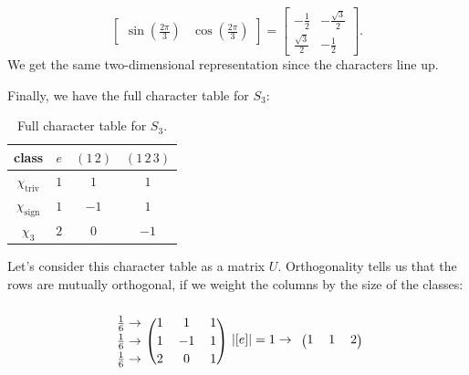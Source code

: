 \documentclass[12pt]{article}
\theoremstyle{definition}
\begin{document}
\begin{enumerate}[start=0]
\begin{enumerate}[(a)]
\begin{equation}
\begin{bmatrix}
                \sin \left( \frac{2\pi }{3} \right) & \cos \left( \frac{2\pi }{3} \right)
            \end{bmatrix}
            =
            \begin{bmatrix}
                -\frac{1}{2} & -\frac{\sqrt{3}}{2} \\[0.5em]
                \frac{\sqrt{3}}{2} & -\frac{1}{2}
            \end{bmatrix}.
        \end{equation}
        We get the same two-dimensional representation since the characters line up.
    \end{enumerate}
    Finally, we have the full character table for $S_3$:
    \begin{table}[H]
        \centering
        \begin{tabular}{|| c || c | c | c ||}
            \hline
            class & $e$ & $(1\,2)$ & $(1\,2\,3)$ \\
            \hline
            $\chi_{\text{triv}}$ & $1$ & $1$ & $1$ \\
            $\chi_{\text{sign}}$ & $1$ & $-1$ & $1$ \\
            $\chi_3$ & $2$ & $0$ & $-1$ \\
            \hline
        \end{tabular}
        \caption{Full character table for $S_3$.}
        \label{tab:Table6}
    \end{table}
    Let's consider this character table as a matrix $U$. Orthogonality tells us that the rows are mutually orthogonal, if we weight the columns by the size of the classes: 
    \begin{equation}
        \begin{blockarray}{cccc}
              &  &  &  \\
            \begin{block}{c(ccc)}
            \frac{1}{6} \rightarrow & 1 & 1 & 1 \\[0.2 em]
            \frac{1}{6} \rightarrow & 1 & -1 & 1 \\[0.2 em]
            \frac{1}{6} \rightarrow & 2 & 0 & 1 \\
            \end{block}
        \end{blockarray}
        \begin{blockarray}{cccc}
              &  &  &  \\
            \begin{block}{c(ccc)}
            |[e]| = 1 \rightarrow & 1 & 1 & 2 \\[0.2 em]

\end{block}
\end{blockarray}
\end{equation}
\end{enumerate}
\end{document}
